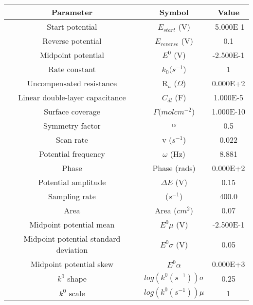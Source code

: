 \documentclass[preview]{standalone}
\begin{document}
\begin{center}
\begin{tabular}{|c|c|c|}
\hline
Parameter & Symbol& Value\\
\hline\hline
Start potential & $E_{start}$ (V) & -5.000E-1 \\
\hline
Reverse potential & $E_{reverse}$ (V) & 0.1 \\
\hline
Midpoint potential & $E^0$ (V) & -2.500E-1 \\
\hline
Rate constant & $k_0 (s^{-1}$) & 1 \\
\hline
Uncompensated resistance & R$_u$ ($\Omega$) & 0.000E+2 \\
\hline
Linear double-layer capacitance & $C_{dl}$ (F) & 1.000E-5 \\
\hline
Surface coverage & $\Gamma (mol cm^{-2}$) & 1.000E-10 \\
\hline
Symmetry factor & $\alpha$& 0.5 \\
\hline
Scan rate & v ($s^{-1}$) & 0.022 \\
\hline
Potential frequency & $\omega$ (Hz) & 8.881 \\
\hline
Phase & Phase (rads) & 0.000E+2 \\
\hline
Potential amplitude & $\Delta E$ (V) & 0.15 \\
\hline
Sampling rate &  ($s^{-1}$) & 400.0 \\
\hline
Area & Area ($cm^{2}$) & 0.07 \\
\hline
Midpoint potential mean & $E^0 \mu$ (V) & -2.500E-1 \\
\hline
Midpoint potential standard deviation & $E^0 \sigma$ (V) & 0.05 \\
\hline
Midpoint potential skew & $E^0 \alpha$& 0.000E+3 \\
\hline
$k^0$ shape & $log(k^0(s^{-1}))\sigma$& 0.25 \\
\hline
$k^0$ scale & $log(k^0(s^{-1}))\mu$& 1 \\
\hline
\end{tabular}
\end{center}
\end{document}
